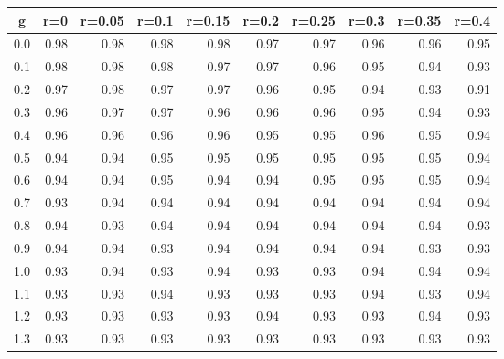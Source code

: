 %
\begin{table}[!tbp]
 \begin{center}
 \begin{tabular}{rrrrrrrrrr}\hline\hline
\multicolumn{1}{c}{g}&\multicolumn{1}{c}{r=0}&\multicolumn{1}{c}{r=0.05}&\multicolumn{1}{c}{r=0.1}&\multicolumn{1}{c}{r=0.15}&\multicolumn{1}{c}{r=0.2}&\multicolumn{1}{c}{r=0.25}&\multicolumn{1}{c}{r=0.3}&\multicolumn{1}{c}{r=0.35}&\multicolumn{1}{c}{r=0.4}\tabularnewline
\hline
0.0&0.98&0.98&0.98&0.98&0.97&0.97&0.96&0.96&0.95\tabularnewline
0.1&0.98&0.98&0.98&0.97&0.97&0.96&0.95&0.94&0.93\tabularnewline
0.2&0.97&0.98&0.97&0.97&0.96&0.95&0.94&0.93&0.91\tabularnewline
0.3&0.96&0.97&0.97&0.96&0.96&0.96&0.95&0.94&0.93\tabularnewline
0.4&0.96&0.96&0.96&0.96&0.95&0.95&0.96&0.95&0.94\tabularnewline
0.5&0.94&0.94&0.95&0.95&0.95&0.95&0.95&0.95&0.94\tabularnewline
0.6&0.94&0.94&0.95&0.94&0.94&0.95&0.95&0.95&0.94\tabularnewline
0.7&0.93&0.94&0.94&0.94&0.94&0.94&0.94&0.94&0.94\tabularnewline
0.8&0.94&0.93&0.94&0.94&0.94&0.94&0.94&0.94&0.93\tabularnewline
0.9&0.94&0.94&0.93&0.94&0.94&0.94&0.94&0.93&0.93\tabularnewline
1.0&0.93&0.94&0.93&0.94&0.93&0.93&0.94&0.94&0.94\tabularnewline
1.1&0.93&0.93&0.94&0.93&0.93&0.93&0.94&0.93&0.94\tabularnewline
1.2&0.93&0.93&0.93&0.93&0.94&0.93&0.93&0.94&0.93\tabularnewline
1.3&0.93&0.93&0.93&0.93&0.93&0.93&0.93&0.93&0.93\tabularnewline
\hline
\end{tabular}

\end{center}

\end{table}

